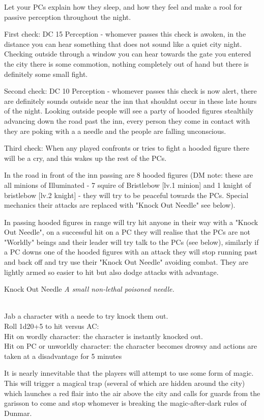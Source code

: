 \documentclass[10pt,twoside,twocolumn]{article}
\begin{document}
Let your PCs explain how they sleep, and how they feel and make a rool for passive perception throughout the night.

First check: DC 15 Perception - whomever passes this check is awoken, in the distance you can hear something that does not sound like a quiet city night. Checking outside through a window you can hear towards the gate you entered the city there is some commotion, nothing completely out of hand but there is definitely some small fight.

Second check: DC 10 Perception - whomever passes this check is now alert, there are definitely sounds outside near the inn that shouldnt occur in these late hours of the night. Looking outside people will see a party of hooded figures stealthily advancing down the road past the inn, every person they come in contact with they are poking with a a needle and the people are falling unconscious.

Third check: When any played confronts or tries to fight a hooded figure there will be a cry, and this wakes up the rest of the PCs.

In the road in front of the inn passing are 8 hooded figures (DM note: these are all minions of Illuminated - 7 squire of Bristlebow [lv.1 minion] and 1 knight of bristlebow [lv.2 knight] - they will try to be peaceful towards the PCs. Special mechanics their attacks are replaced with "Knock Out Needle" see below).

In passing hooded figures in range will try hit anyone in their way with a "Knock Out Needle", on a successful hit on a PC they will realise that the PCs are not "Worldly" beings and their leader will try talk to the PCs (see below), similarly if a PC downs one of the hooded figures with an attack they will stop running past and back off and try use their "Knock Out Needle" avoiding combat. They are lightly armed so easier to hit but also dodge attacks with advantage.

\begin{itembox}{Knock Out Needle}
	\textit{A small non-lethal poisoned needle.}\\
	\hline \\[1mm]
	\begin{itemaction}
		Jab a character with a neede to try knock them out.\\
		Roll 1d20+5 to hit versus AC:\\
		Hit on wordly character: the character is instantly knocked out.\\
		Hit on PC or unworldly character: the character becomes drowsy and actions are taken at a disadvantage for 5 minutes
	\end{itemaction}
\end{itembox}

It is nearly innevitable that the players will attempt to use some form of magic. This will trigger a magical trap (several of which are hidden around the city) which launches a red flair into the air above the city and calls for guards from the garisson to come and stop whomever is breaking the magic-after-dark rules of Dunmar.

\end{document}

